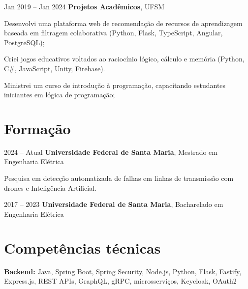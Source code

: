 \vspace{0.2 cm}

\begin{twocolentry}{Jan 2019 – Jan 2024}
\textbf{Projetos Acadêmicos}, UFSM\end{twocolentry}
\vspace{0.10 cm}
\begin{onecolentry}
    \begin{highlights}
        \item Desenvolvi uma plataforma web de recomendação de recursos de aprendizagem baseada em filtragem colaborativa (Python, Flask, TypeScript, Angular, PostgreSQL);
        \item Criei jogos educativos voltados ao raciocínio lógico, cálculo e memória (Python, C\#, JavaScript, Unity, Firebase).
        \item Ministrei um curso de introdução à programação, capacitando estudantes iniciantes em lógica de programação;
    \end{highlights}
\end{onecolentry}



\section{Formação}

\begin{twocolentry}{2024 – Atual}
\textbf{Universidade Federal de Santa Maria}, Mestrado em Engenharia Elétrica\end{twocolentry}
\vspace{0.10 cm}
\begin{onecolentry}
    Pesquisa em detecção automatizada de falhas em linhas de transmissão com drones e Inteligência Artificial.
\end{onecolentry}

\vspace{0.10 cm}
\begin{twocolentry}{2017 – 2023}
\textbf{Universidade Federal de Santa Maria}, Bacharelado em Engenharia Elétrica\end{twocolentry}



\section{Competências técnicas}

\begin{onecolentry}
    \textbf{Backend:} Java, Spring Boot, Spring Security, Node.js, Python, Flask, Fastify, Express.js, REST APIs, GraphQL, gRPC, microsserviços, Keycloak, OAuth2
\end{onecolentry}

